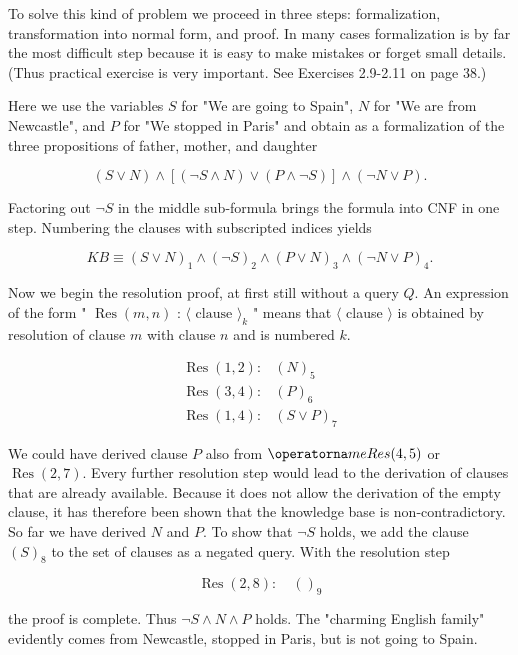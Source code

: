 \documentclass[10pt]{article}
\begin{document}
To solve this kind of problem we proceed in three steps: formalization, transformation into normal form, and proof. In many cases formalization is by far the most difficult step because it is easy to make mistakes or forget small details. (Thus practical exercise is very important. See Exercises 2.9-2.11 on page 38.)

Here we use the variables $S$ for "We are going to Spain", $N$ for "We are from Newcastle", and $P$ for "We stopped in Paris" and obtain as a formalization of the three propositions of father, mother, and daughter

$$
(S \vee N) \wedge[(\neg S \wedge N) \vee(P \wedge \neg S)] \wedge(\neg N \vee P) .
$$

Factoring out $\neg S$ in the middle sub-formula brings the formula into CNF in one step. Numbering the clauses with subscripted indices yields

$$
K B \equiv(S \vee N)_{1} \wedge(\neg S)_{2} \wedge(P \vee N)_{3} \wedge(\neg N \vee P)_{4} .
$$

Now we begin the resolution proof, at first still without a query $Q$. An expression of the form " $\operatorname{Res}(m, n)$ : $\langle\text { clause }\rangle_{k}$ " means that $\langle$ clause $\rangle$ is obtained by resolution of clause $m$ with clause $n$ and is numbered $k$.

$$
\begin{array}{ll}
\operatorname{Res}(1,2): & (N)_{5} \\
\operatorname{Res}(3,4): & (P)_{6} \\
\operatorname{Res}(1,4): & (S \vee P)_{7}
\end{array}
$$

We could have derived clause $P$ also from $\operatorna
me{Res}(4,5)$ or $\operatorname{Res}(2,7)$. Every further resolution step would lead to the derivation of clauses that are already available. Because it does not allow the derivation of the empty clause, it has therefore been shown that the knowledge base is non-contradictory. So far we have derived $N$ and $P$. To show that $\neg S$ holds, we add the clause $(S)_{8}$ to the set of clauses as a negated query. With the resolution step

$$
\operatorname{Res}(2,8): \quad()_{9}
$$

the proof is complete. Thus $\neg S \wedge N \wedge P$ holds. The "charming English family" evidently comes from Newcastle, stopped in Paris, but is not going to Spain.
\end{document}

